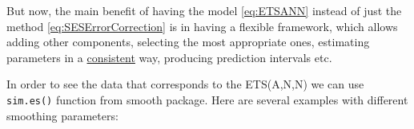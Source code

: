 \documentclass[
]{book}
\newenvironment{Shaded}{\begin{snugshade}}{\end{snugshade}}
\newcommand{\AttributeTok}[1]{\textcolor[rgb]{0.77,0.63,0.00}{#1}}
\newcommand{\ControlFlowTok}[1]{\textcolor[rgb]{0.13,0.29,0.53}{\textbf{#1}}}
\newcommand{\DecValTok}[1]{\textcolor[rgb]{0.00,0.00,0.81}{#1}}
\newcommand{\FloatTok}[1]{\textcolor[rgb]{0.00,0.00,0.81}{#1}}
\newcommand{\FunctionTok}[1]{\textcolor[rgb]{0.00,0.00,0.00}{#1}}
\newcommand{\NormalTok}[1]{#1}
\newcommand{\OtherTok}[1]{\textcolor[rgb]{0.56,0.35,0.01}{#1}}
\newcommand{\SpecialCharTok}[1]{\textcolor[rgb]{0.00,0.00,0.00}{#1}}
\newcommand{\StringTok}[1]{\textcolor[rgb]{0.31,0.60,0.02}{#1}}
\theoremstyle{definition}
\theoremstyle{definition}
\theoremstyle{definition}
\theoremstyle{definition}
\theoremstyle{remark}
\begin{document}
But now, the main benefit of having the model \eqref{eq:ETSANN} instead of just the method \eqref{eq:SESErrorCorrection} is in having a flexible framework, which allows adding other components, selecting the most appropriate ones, estimating parameters in a \protect\hyperlink{intro}{consistent} way, producing prediction intervals etc.

In order to see the data that corresponds to the ETS(A,N,N) we can use \texttt{sim.es()} function from smooth package. Here are several examples with different smoothing parameters:

\begin{Shaded}
\end{Shaded}
\end{document}
